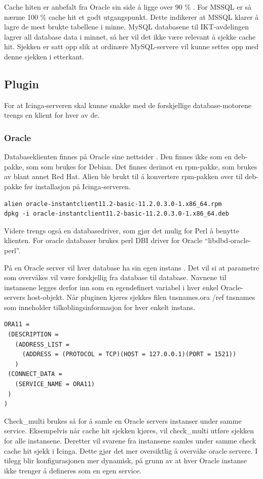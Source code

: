 Cache hiten er anbefalt fra Oracle sin side å ligge over 90 \% \cite{oraclecachehit}. 
For MSSQL er så nærme 100 \% cache hit et godt utgangspunkt. Dette indikerer at MSSQL klarer å lagre de mest brukte tabellene i minne. \cite{sqlmonitoring}
MySQL databasene til IKT-avdelingen lagrer all database data i minnet, så her vil det ikke være relevant å sjekke cache hit. Sjekken er satt opp slik at ordinære MySQL-servere vil kunne settes opp med denne sjekken i etterkant.

\subsection{Plugin} %
For at Icinga-serveren skal kunne snakke med de forskjellige database-motorene trengs en klient for hver av de. 

\subsubsection{Oracle}
Databaseklienten finnes på Oracle sine nettsider \cite{oracleclient}. Den finnes ikke som en deb-pakke, som som brukes for Debian. Det finnes derimot en rpm-pakke, som brukes av blant annet Red Hat. Alien \cite{debian:alien} ble brukt til å konvertere rpm-pakken over til deb-pakke før installasjon på Icinga-serveren. 
\begin{lstlisting}
alien oracle-instantclient11.2-basic-11.2.0.3.0-1.x86_64.rpm 
dpkg -i oracle-instantclient11.2-basic-11.2.0.3.0-1.x86_64.deb
\end{lstlisting}
Videre trengs også en databasedriver, som gjør det mulig for Perl å benytte klienten. For oracle databaser brukes perl DBI driver for Oracle “libdbd-oracle-perl”.

På en Oracle server vil hver database ha sin egen instans \cite{oraclefaq}. Det vil si at parametre som overvåkes vil være forskjellig fra database til database. Navnene til instansene legges derfor inn som en egendefinert variabel i hver enkel Oracle-servers host-objekt. Når pluginen kjøres sjekkes filen tnsnames.ora /ref tnsnames  som inneholder tilkoblingsinformasjon for hver enkelt instans.
\begin{lstlisting}
ORA11 =
 (DESCRIPTION = 
   (ADDRESS_LIST =
     (ADDRESS = (PROTOCOL = TCP)(HOST = 127.0.0.1)(PORT = 1521))
   )
 (CONNECT_DATA =
   (SERVICE_NAME = ORA11)
 )
)
\end{lstlisting}
Check\_multi brukes så for å samle en Oracle servers instanser under samme service. Eksempelvis når cache hit sjekken kjøres, vil check\_multi utføre sjekken for alle instansene. Deretter vil svarene fra instansene samles under samme check cache hit sjekk i Icinga. Dette gjør det mer oversiktlig å overvåke oracle servere. I tilegg blir konfigurasjonen mer dynamisk, på grunn av at hver Oracle instanse ikke trenger å defineres som en egen service.

